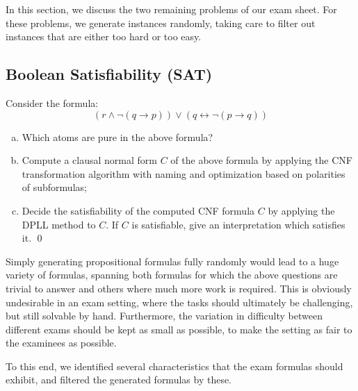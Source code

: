 In this section, we discuss the two remaining problems of our exam sheet.
For these problems, we generate instances randomly,
taking care to filter out instances that are either too hard or too easy.

\subsection{Boolean Satisfiability (SAT)}

\begin{mdframed}
    \begin{example}
        Consider the formula:
        \[
            ( r \land \lnot ( q \rightarrow p ) ) \lor ( q \leftrightarrow \lnot ( p \rightarrow q ) )
        \]
        \begin{enumerate}[(a)]
            \item
                Which atoms are pure in the above formula?
            \item\label{subtask:sat-cnf}
                Compute a clausal normal form $C$ of the above formula by
                applying the CNF transformation algorithm with naming and
                optimization based on polarities of subformulas;
            \item
                Decide the satisfiability of the computed CNF formula $C$
                by applying the DPLL method to $C$. If $C$ is
                satisfiable, give an interpretation which
                satisfies it.
                \qed
        \end{enumerate}
    \end{example}
\end{mdframed}


Simply generating propositional formulas fully randomly would lead
to a huge variety of formulas,
spanning both formulas for which the above questions are trivial to answer
and others where much more work is required.
This is obviously undesirable in an exam setting,
where the tasks should ultimately be challenging, but still solvable by hand.
Furthermore,
the variation in difficulty between different exams should be kept as small as possible,
to make the setting as fair to the examinees as possible.

To this end,
we identified several characteristics that the exam formulas should exhibit,
and filtered the generated formulas by these.

